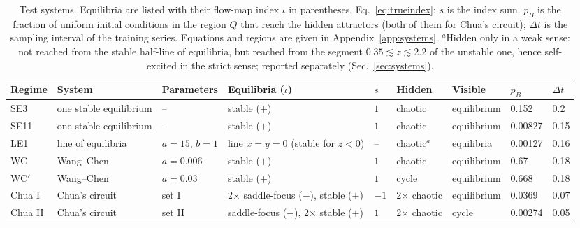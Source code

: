 \begin{table}
\caption{Test systems. Equilibria are listed with their flow-map index $\iota$ in parentheses, Eq.~\eqref{eq:trueindex};
$s$ is the index sum. $p_B$ is the fraction of uniform initial conditions in the region $Q$ that reach the hidden
attractors (both of them for Chua's circuit); $\Delta t$ is the sampling interval of the training series. Equations and
regions are given in Appendix~\ref{app:systems}. $^{a}$Hidden only in a weak sense: not reached from the stable half-line of
equilibria, but reached from the segment $0.35\lesssim z\lesssim2.2$ of the unstable one, hence self-excited in the strict
sense; reported separately (Sec.~\ref{sec:systems}).}
\label{tab:systems}
\begin{ruledtabular}
\begin{tabular}{lllllllll}
Regime & System & Parameters & Equilibria ($\iota$) & $s$ & Hidden & Visible & $p_B$ & $\Delta t$ \\
\hline
SE3 & one stable equilibrium & -- & stable ($+$) & $1$ & chaotic & equilibrium & 0.152 & 0.2 \\
SE11 & one stable equilibrium & -- & stable ($+$) & $1$ & chaotic & equilibrium & 0.00827 & 0.15 \\
LE1 & line of equilibria & $a=15$, $b=1$ & line $x=y=0$ (stable for $z<0$) & -- & chaotic$^{a}$ & equilibria & 0.00127 & 0.16 \\
WC & Wang--Chen & $a=0.006$ & stable ($+$) & $1$ & chaotic & equilibrium & 0.67 & 0.18 \\
WC$'$ & Wang--Chen & $a=0.03$ & stable ($+$) & $1$ & cycle & equilibrium & 0.668 & 0.18 \\
Chua I & Chua's circuit & set I & 2$\times$ saddle-focus ($-$), stable ($+$) & $-1$ & 2$\times$ chaotic & equilibrium & 0.0369 & 0.07 \\
Chua II & Chua's circuit & set II & saddle-focus ($-$), 2$\times$ stable ($+$) & $1$ & 2$\times$ chaotic & cycle & 0.00274 & 0.05 \\
\end{tabular}
\end{ruledtabular}
\end{table}
